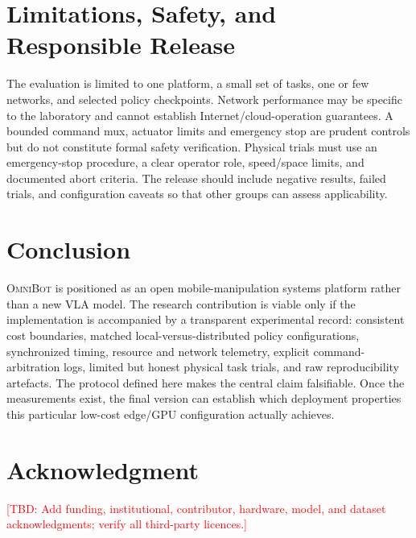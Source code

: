 \documentclass[letterpaper,10pt,conference]{ieeeconf}
\newcommand{\TBD}[1]{\textcolor{red}{[TBD: #1]}}
\newcommand{\OmniBot}{\textsc{OmniBot}}
\begin{document}
\section{Limitations, Safety, and Responsible Release}
\label{sec:limits}

The evaluation is limited to one platform, a small set of tasks, one or few networks, and selected policy checkpoints. Network performance may be specific to the laboratory and cannot establish Internet/cloud-operation guarantees. A bounded command mux, actuator limits and emergency stop are prudent controls but do not constitute formal safety verification. Physical trials must use an emergency-stop procedure, a clear operator role, speed/space limits, and documented abort criteria. The release should include negative results, failed trials, and configuration caveats so that other groups can assess applicability.

\section{Conclusion}
\label{sec:conclusion}

\OmniBot{} is positioned as an open mobile-manipulation systems platform rather than a new VLA model. The research contribution is viable only if the implementation is accompanied by a transparent experimental record: consistent cost boundaries, matched local-versus-distributed policy configurations, synchronized timing, resource and network telemetry, explicit command-arbitration logs, limited but honest physical task trials, and raw reproducibility artefacts. The protocol defined here makes the central claim falsifiable. Once the measurements exist, the final version can establish which deployment properties this particular low-cost edge/GPU configuration actually achieves.

\section*{Acknowledgment}
\TBD{Add funding, institutional, contributor, hardware, model, and dataset acknowledgments; verify all third-party licences.}



\end{document}
